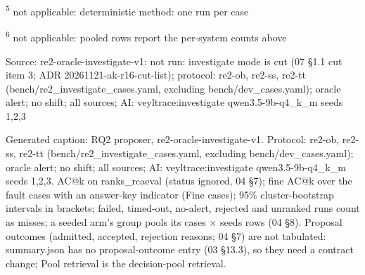 \textsuperscript{5} not applicable: deterministic method: one run per case\par
\textsuperscript{6} not applicable: pooled rows report the per-system counts above\par
\noindent Source: re2-oracle-investigate-v1: not run: investigate mode is cut (07 \S{}1.1 cut item 3; ADR 20261121-ak-r16-cut-list); protocol: re2-ob, re2-ss, re2-tt (bench/\allowbreak{}re2\_investigate\_cases.yaml, excluding bench/\allowbreak{}dev\_cases.yaml); oracle alert; no shift; all sources; AI: veyltrace:investigate qwen3.5-9b-q4\_k\_m seeds 1,2,3\par
\noindent Generated caption: RQ2 proposer, re2-oracle-investigate-v1. Protocol: re2-ob, re2-ss, re2-tt (bench/\allowbreak{}re2\_investigate\_cases.yaml, excluding bench/\allowbreak{}dev\_cases.yaml); oracle alert; no shift; all sources; AI: veyltrace:investigate qwen3.5-9b-q4\_k\_m seeds 1,2,3. AC@k on ranks\_rcaeval (status ignored, 04 \S{}7); fine AC@k over the fault cases with an answer-key indicator (Fine cases); 95\% cluster-bootstrap intervals in brackets; failed, timed-out, no-alert, rejected and unranked runs count as misses; a seeded arm's group pools its cases $\times$ seeds rows (04 \S{}8). Proposal outcomes (admitted, accepted, rejection reasons; 04 \S{}7) are not tabulated: summary.json has no proposal-outcome entry (03 \S{}13.3), so they need a contract change; Pool retrieval is the decision-pool retrieval.\par
\endgroup
